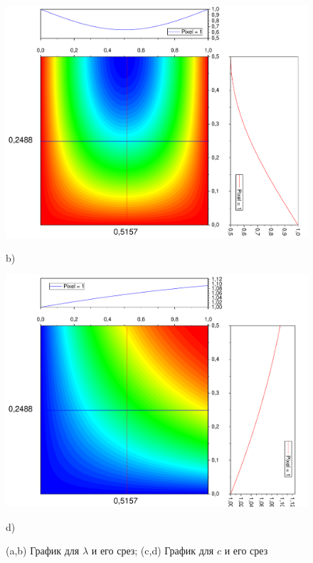 \documentclass[a4paper,12pt]{article}
\begin{document}
\begin{figure}[h!]
\begin{center}
		\begin{minipage}[h]{0.24\linewidth}
			\includegraphics[width=\textwidth]{graphs/graphs_l/ro_srez.pdf} \begin{center}	b)	\end{center}
		\end{minipage}
		\begin{minipage}[h]{0.24\linewidth}
			\includegraphics[width=\textwidth]{graphs/graphs_l/T_srez.pdf} \begin{center}	d)	\end{center}
		\end{minipage}
	\end{center}
	\caption{(a,b) График для $\lambda$ и его срез; (c,d) График для $c$ и его срез}
\end{figure}
\end{document}
